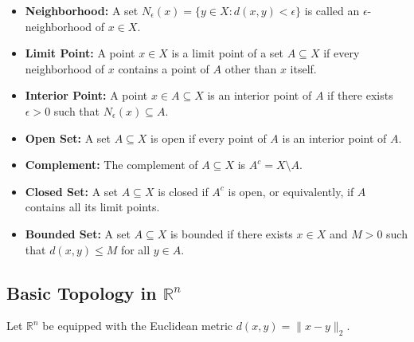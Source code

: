 \begin{itemize}
    \item \textbf{Neighborhood:} A set $N_\epsilon(x) = \{y \in X : d(x,y) < \epsilon\}$ is called an $\epsilon$-neighborhood of $x \in X$.

    \item \textbf{Limit Point:} A point $x \in X$ is a limit point of a set $A \subseteq X$ if every neighborhood of $x$ contains a point of $A$ other than $x$ itself.

    \item \textbf{Interior Point:} A point $x \in A \subseteq X$ is an interior point of $A$ if there exists $\epsilon > 0$ such that $N_\epsilon(x) \subseteq A$.

    \item \textbf{Open Set:} A set $A \subseteq X$ is open if every point of $A$ is an interior point of $A$.

    \item \textbf{Complement:} The complement of $A \subseteq X$ is $A^c = X \setminus A$.

    \item \textbf{Closed Set:} A set $A \subseteq X$ is closed if $A^c$ is open, or equivalently, if $A$ contains all its limit points.

    \item \textbf{Bounded Set:} A set $A \subseteq X$ is bounded if there exists $x \in X$ and $M > 0$ such that $d(x,y) \leq M$ for all $y \in A$.
\end{itemize}

\subsection{Basic Topology in $\mathbb{R}^n$}

Let $\mathbb{R}^n$ be equipped with the Euclidean metric $d(x,y) = \|x-y\|_2$.  

